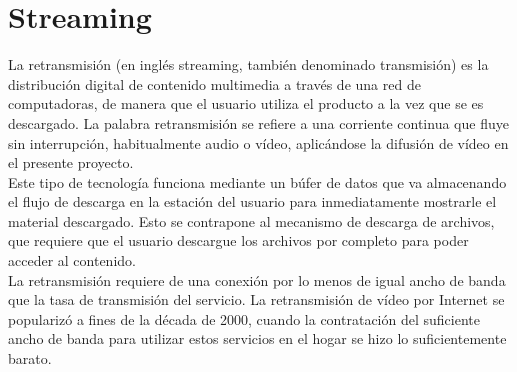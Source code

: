 \section{Streaming}
\label{sec:def-streaming}


La retransmisión (en inglés streaming, también denominado transmisión) es la distribución digital de contenido multimedia a través de una red de computadoras, 
de manera que el usuario utiliza el producto a la vez que se es descargado. La palabra retransmisión se refiere a una corriente continua que fluye sin interrupción, habitualmente audio o vídeo, aplicándose la difusión 
de vídeo en el presente proyecto. \\

Este tipo de tecnología funciona mediante un búfer de datos que va almacenando el flujo de descarga en la estación del usuario para inmediatamente mostrarle el material descargado. Esto se contrapone al mecanismo de
descarga de archivos, que requiere que el usuario descargue los archivos por completo para poder acceder al contenido.\\

La retransmisión requiere de una conexión por lo menos de igual ancho de banda que la tasa de transmisión del servicio. La retransmisión de vídeo por Internet se popularizó a fines de la década de 2000, 
cuando la contratación del suficiente ancho de banda para utilizar estos servicios en el hogar se hizo lo suficientemente barato.